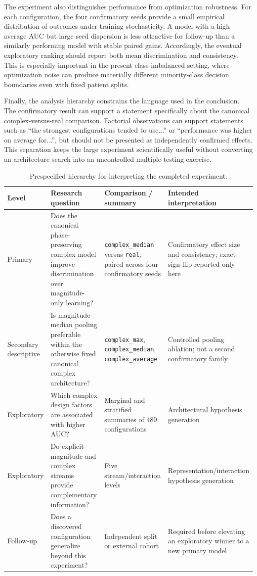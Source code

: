 \documentclass[journal]{IEEEtran}
\begin{document}
The experiment also distinguishes performance from optimization robustness. For each configuration, the four confirmatory seeds provide a small empirical distribution of outcomes under training stochasticity. A model with a high average AUC but large seed dispersion is less attractive for follow-up than a similarly performing model with stable paired gains. Accordingly, the eventual exploratory ranking should report both mean discrimination and consistency. This is especially important in the present class-imbalanced setting, where optimization noise can produce materially different minority-class decision boundaries even with fixed patient splits.

Finally, the analysis hierarchy constrains the language used in the conclusion. The confirmatory result can support a statement specifically about the canonical complex-versus-real comparison. Factorial observations can support statements such as ``the strongest configurations tended to use...'' or ``performance was higher on average for...'', but should not be presented as independently confirmed effects. This separation keeps the large experiment scientifically useful without converting an architecture search into an uncontrolled multiple-testing exercise.

\begin{table}[t]
\centering
\caption{Prespecified hierarchy for interpreting the completed experiment.}
\label{tab:hypotheses}
\scriptsize
\begin{tabularx}{\textwidth}{L{1.5cm}L{5.0cm}L{4.1cm}X}
\toprule
Level & Research question & Comparison / summary & Intended interpretation \\
\midrule
Primary & Does the canonical phase-preserving complex model improve discrimination over magnitude-only learning? & \texttt{complex\_median} versus \texttt{real}, paired across four confirmatory seeds & Confirmatory effect size and consistency; exact sign-flip reported only here \\
Secondary descriptive & Is magnitude-median pooling preferable within the otherwise fixed canonical complex architecture? & \texttt{complex\_max}, \texttt{complex\_median}, \texttt{complex\_average} & Controlled pooling ablation; not a second confirmatory family \\
Exploratory & Which complex design factors are associated with higher AUC? & Marginal and stratified summaries of 480 configurations & Architectural hypothesis generation \\
Exploratory & Do explicit magnitude and complex streams provide complementary information? & Five stream/interaction levels & Representation/interaction hypothesis generation \\
Follow-up & Does a discovered configuration generalize beyond this experiment? & Independent split or external cohort & Required before elevating an exploratory winner to a new primary model \\
\bottomrule
\end{tabularx}
\end{table}
\end{document}
